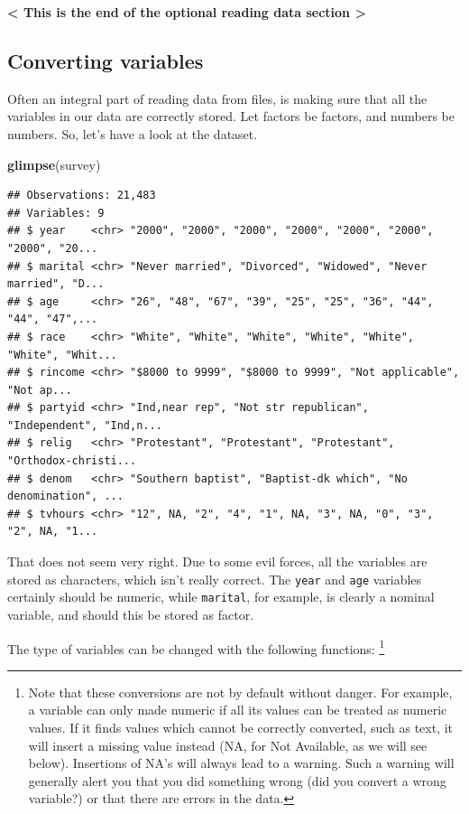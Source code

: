 \documentclass[]{tufte-book}
\newenvironment{Shaded}{}{}
\newcommand{\KeywordTok}[1]{\textcolor[rgb]{0.00,0.44,0.13}{\textbf{#1}}}
\newcommand{\NormalTok}[1]{#1}
\begin{document}
\textbf{\textless{} This is the end of the optional reading data section \textgreater{}}

\hypertarget{converting-variables}{%
\subsection{Converting variables}\label{converting-variables}}

Often an integral part of reading data from files, is making sure that all the variables in our data are correctly stored. Let factors be factors, and numbers be numbers. So, let's have a look at the dataset.

\begin{Shaded}
\begin{Highlighting}[]
\KeywordTok{glimpse}\NormalTok{(survey)}
\end{Highlighting}
\end{Shaded}

\begin{verbatim}
## Observations: 21,483
## Variables: 9
## $ year    <chr> "2000", "2000", "2000", "2000", "2000", "2000", "2000", "20...
## $ marital <chr> "Never married", "Divorced", "Widowed", "Never married", "D...
## $ age     <chr> "26", "48", "67", "39", "25", "25", "36", "44", "44", "47",...
## $ race    <chr> "White", "White", "White", "White", "White", "White", "Whit...
## $ rincome <chr> "$8000 to 9999", "$8000 to 9999", "Not applicable", "Not ap...
## $ partyid <chr> "Ind,near rep", "Not str republican", "Independent", "Ind,n...
## $ relig   <chr> "Protestant", "Protestant", "Protestant", "Orthodox-christi...
## $ denom   <chr> "Southern baptist", "Baptist-dk which", "No denomination", ...
## $ tvhours <chr> "12", NA, "2", "4", "1", NA, "3", NA, "0", "3", "2", NA, "1...
\end{verbatim}

That does not seem very right. Due to some evil forces, all the variables are stored as characters, which isn't really correct. The \texttt{year} and \texttt{age} variables certainly should be numeric, while \texttt{marital}, for example, is clearly a nominal variable, and should this be stored as factor.

The type of variables can be changed with the following functions: \footnote{Note that these conversions are not by default without danger. For example, a variable can only made numeric if all its values can be treated as numeric values. If it finds values which cannot be correctly converted, such as text, it will insert a missing value instead (NA, for Not Available, as we will see below). Insertions of NA's will always lead to a warning. Such a warning will generally alert you that you did something wrong (did you convert a wrong variable?) or that there are errors in the data.}
\end{document}

